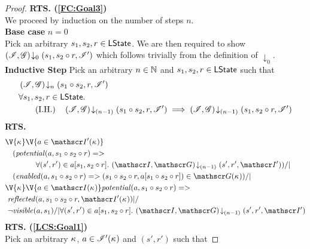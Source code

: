 \begin{lemma}
\begin{proof}
\noindent\textbf{RTS. (\ref{FC:Goal3})} \\
We proceed by induction on the number of steps $n$.\\

\noindent\textbf{Base case }$n=0$\\
Pick an arbitrary $s_1, s_2, r \in \textsf{LState}$. We are then required to show	$\left(\mathscr{I}, \mathscr{G}\right) \!\downarrow_{0} \left(s_1, s_2 \circ r, \mathscr{I}'\right) $ which follows trivially from the definition of $\downarrow_0$.\\

\noindent\textbf{Inductive Step} Pick an arbitrary $n \in \mathbb{N}$ and $s_1, s_2, r \in \textsf{LState}$ such that
%
\begin{align}
	& \extendsAMUpto{\lmod, \gmod}{n}{s_1 \composeL s_2}{r}{\lmod'} \label{LCS:Ass1}\\
%
	&	\for{s_1, s_2, r \in \LStates} \nonumber \\	
	& \tag{I.H.} \quad\extendsAMUpto{\lmod, \gmod}{(n-1)}{s_1 \composeL s_2}{r}{\lmod'} \implies 
										\extendsAMUpto{\lmod, \gmod}{(n-1)}{s_1}{s_2 \composeL r}{\lmod'} \label{LCS:IH}
\end{align}
%
\textbf{RTS. }
%
\begin{align}
	& 
	\V{\ca{}}  \V{a\in \lmod'(\ca{})} \nonumber \\
  &\quad (\m{potential}(a, s_1 \composeL s_2\composeL r) => \nonumber\\
  & \qquad \qquad\for{(s', r') \in a[s_1, s_2 \composeL r]} \extendsAMUpto{\lmod, \gmod}{(n-1)}{s'}{r'}{\lmod'}) \label{LCS:Goal1} /| \\
%    
  &\quad (\m{enabled}(a,s_1 \composeL s_2 \composeL r)
  => (s_1 \composeL s_2 \composeL r,
  a[s_1 \composeL s_2 \composeL r])\in \gmod(\ca{}))
  /|\null \label{LCS:Goal2}\\
%  
  &\V{\ca{}}\V{a\in \lmod(\ca{})}
  \m{potential}(a,s_1 \composeL s_2 \composeL r) =>\null \nonumber \\
  &\ \m{reflected}(a,s_1 \composeL s_2 \composeL r,\lmod'(\ca{})) |/\null \nonumber \\
%  
  &\ \neg\m{visible}(a,s_1) /| \for{(s', r') \in a[s_1, s_2 \composeL r]} \extendsAMUpto{\lmod, \gmod}{(n-1)}{s'}{r'}{\lmod'}  \label{LCS:Goal3}
%
\end{align}
%
\textbf{RTS. (\ref{LCS:Goal1})}\\
Pick an arbitrary $\kappa_{}$, $a \in \mathscr{I}'(\kappa_{})$ and $(s', r')$ such that 

\end{proof}
\end{lemma}
